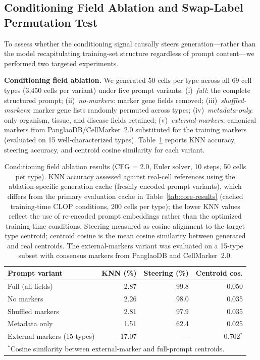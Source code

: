 \documentclass[fleqn,10pt,lineno]{wlpeerj}
\begin{document}
\subsection*{Conditioning Field Ablation and Swap-Label Permutation Test}\label{sec:cond-ablation}

To assess whether the conditioning signal causally steers generation---rather than the model recapitulating training-set structure regardless of prompt content---we performed two targeted experiments.

\textbf{Conditioning field ablation.} We generated 50 cells per type across all 69 cell types (3,450 cells per variant) under five prompt variants: (i)~\emph{full}: the complete structured prompt; (ii)~\emph{no-markers}: marker gene fields removed; (iii)~\emph{shuffled-markers}: marker gene lists randomly permuted across types; (iv)~\emph{metadata-only}: only organism, tissue, and disease fields retained; (v)~\emph{external-markers}: canonical markers from PanglaoDB/CellMarker~2.0 substituted for the training markers (evaluated on 15 well-characterized types). Table~\ref{tab:cond-ablation} reports KNN accuracy, steering accuracy, and centroid cosine similarity for each variant.

\begin{table}[!htbp]
\centering
\caption{Conditioning field ablation results (CFG = 2.0, Euler solver, 10 steps, 50 cells per type). KNN accuracy assessed against real-cell references using the ablation-specific generation cache (freshly encoded prompt variants), which differs from the primary evaluation cache in Table~\ref{tab:core-results} (cached training-time CLOP conditions, 200 cells per type); the lower KNN values reflect the use of re-encoded prompt embeddings rather than the optimized training-time conditions. Steering measured as cosine alignment to the target type centroid; centroid cosine is the mean cosine similarity between generated and real centroids. The external-markers variant was evaluated on a 15-type subset with consensus markers from PanglaoDB and CellMarker~2.0.\label{tab:cond-ablation}}
\begin{tabular}{lrrr}
\toprule
Prompt variant & KNN (\%) & Steering (\%) & Centroid cos. \\
\midrule
Full (all fields) & 2.87 & 99.8 & 0.050 \\
No markers & 2.26 & 98.0 & 0.035 \\
Shuffled markers & 2.81 & 97.9 & 0.035 \\
Metadata only & 1.51 & 62.4 & 0.025 \\
External markers (15 types) & 17.07 & --- & 0.702$^*$ \\
\bottomrule
\multicolumn{4}{l}{\footnotesize $^*$Cosine similarity between external-marker and full-prompt centroids.}
\end{tabular}
\end{table}
\end{document}
